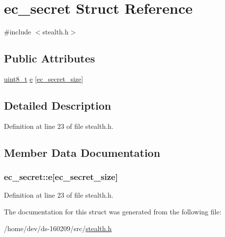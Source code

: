 \hypertarget{structec__secret}{}\section{ec\+\_\+secret Struct Reference}
\label{structec__secret}


{\ttfamily \#include $<$stealth.\+h$>$}

\subsection*{Public Attributes}
\begin{DoxyCompactItemize}
\item 
\hyperlink{stdint_8h_aba7bc1797add20fe3efdf37ced1182c5}{uint8\+\_\+t} \hyperlink{structec__secret_a67a32d917614aee8dc96e5e92c821e03}{e} \mbox{[}\hyperlink{stealth_8h_a9ebf73ce7586af72448f2d5f3dd57c78}{ec\+\_\+secret\+\_\+size}\mbox{]}
\end{DoxyCompactItemize}


\subsection{Detailed Description}


Definition at line 23 of file stealth.\+h.



\subsection{Member Data Documentation}
\hypertarget{structec__secret_a67a32d917614aee8dc96e5e92c821e03}{}
\subsubsection[{e}]{ ec\+\_\+secret\+::e\mbox{[}{\bf ec\+\_\+secret\+\_\+size}\mbox{]}}\label{structec__secret_a67a32d917614aee8dc96e5e92c821e03}


Definition at line 23 of file stealth.\+h.



The documentation for this struct was generated from the following file\+:\begin{DoxyCompactItemize}
\item 
/home/dev/ds-\/160209/src/\hyperlink{stealth_8h}{stealth.\+h}\end{DoxyCompactItemize}

